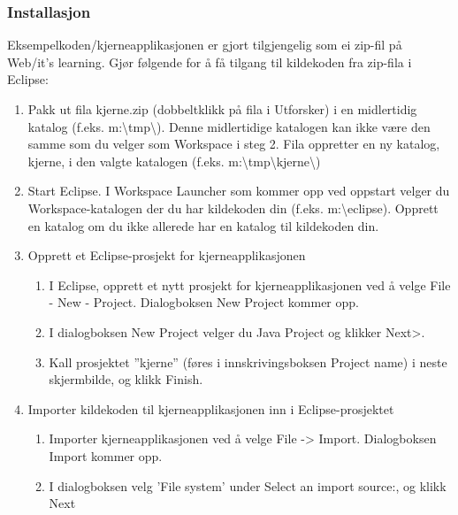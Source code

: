 \subsubsection{Installasjon}

Eksempelkoden/kjerneapplikasjonen er gjort tilgjengelig som ei zip-fil på Web/it’s learning. Gjør følgende for å få tilgang til kildekoden fra zip-fila i Eclipse:

\begin{enumerate}

\item
Pakk ut fila kjerne.zip (dobbeltklikk på fila i Utforsker) i en midlertidig katalog (f.eks. m:\textbackslash tmp\textbackslash ).  Denne midlertidige katalogen kan ikke være den samme som du velger som Workspace i steg 2. Fila oppretter en ny katalog, kjerne, i den valgte katalogen (f.eks. m:\textbackslash tmp\textbackslash kjerne\textbackslash )

\item
Start Eclipse. I Workspace Launcher som kommer opp ved oppstart velger du Workspace-katalogen der du har kildekoden din (f.eks. m:\textbackslash eclipse).  Opprett en katalog om du ikke allerede har en katalog til kildekoden din.

\item
Opprett et Eclipse-prosjekt for kjerneapplikasjonen
\begin{enumerate}

\item
I Eclipse, opprett et nytt prosjekt for kjerneapplikasjonen ved å velge File - New - Project.  Dialogboksen New Project kommer opp.

\item
I dialogboksen New Project velger du Java Project og klikker Next>.

\item
Kall prosjektet ”kjerne” (føres i innskrivingsboksen Project name) i neste skjermbilde, og klikk Finish.

\end{enumerate}

\item
Importer kildekoden til kjerneapplikasjonen inn i Eclipse-prosjektet

\begin{enumerate}

\item
Importer kjerneapplikasjonen ved å velge File -> Import.  Dialogboksen Import kommer opp.

\item
I dialogboksen velg 'File system' under Select an import source:, og klikk Next


\end{enumerate}
\end{enumerate}
